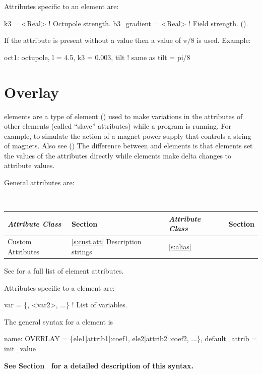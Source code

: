 {
Attributes specific to an  element are:
\begin{example}
  k3          = <Real>   ! Octupole strength.
  b3_gradient = <Real>   ! Field strength. ().
\end{example}

If the  attribute is present without a value then a value of 
$\pi/8$ is used.
Example:
\begin{example}
  oct1: octupole, l = 4.5, k3 = 0.003, tilt ! same as tilt = pi/8
\end{example}

\section{Overlay}
\label{s:overlay}

 elements are a type of  element
() used to make variations in the attributes of
other elements (called ``slave'' attributes) while a program is
running. For example, to simulate the action of a magnet power supply
that controls a string of magnets. Also see 
() The difference between  and 
elements is that  elements set the values of the
attributes directly while  elements make delta changes to
attribute values.

General  attributes are:
\begin{center}
\tt
\begin{tabular}{llll} \toprule
  {\sl Attribute Class}      & Section           & {\sl Attribute Class}      & Section         \\ \midrule
  Custom Attributes          & \ref{s:cust.att}  Description strings        & \ref{s:alias}     \\ 
  \bottomrule
\end{tabular}
\end{center}
\toffset
See  for a full list of element attributes.

Attributes specific to a  element are:
\begin{example}
  var = \{<var1>, <var2>, ...\}   ! List of variables.
\end{example}

The general syntax for a  element is
\begin{example}
  name: OVERLAY = \{ele1[attrib1]:coef1, ele2[attrib2]:coef2, ...\}, 
                                                       default_attrib = init_value
\end{example}
\textbf{See Section~ for a detailed description of this syntax.}

}
